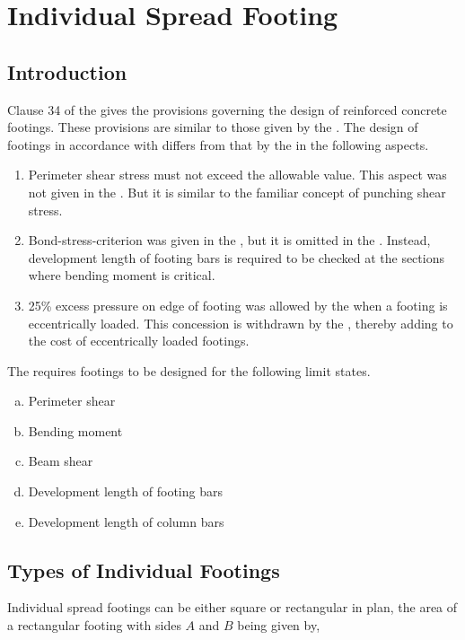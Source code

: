 \chapter{Individual Spread Footing}
\section{Introduction} Clause 34 of the   gives the
provisions governing the design of reinforced concrete footings.  These
provisions are similar to those given by the \citeauthor{aci1981aci}. 
The design of footings in accordance with  differs
from that by the  in the following aspects.

\begin{enumerate}[I]
\item Perimeter shear stress must not exceed the allowable value. This
aspect was not given in the . But it is similar to
the familiar concept of punching shear stress.

\item Bond-stress-criterion was given in the , but it
is omitted in the . Instead, development length of
footing bars is required to be checked at the sections where bending
moment is critical.

\item 25\% excess pressure on edge of footing was allowed by the 
 when a footing is eccentrically loaded. This 
concession is withdrawn by the , thereby adding to 
the cost of eccentrically loaded footings.
\end{enumerate}
The  requires footings to be designed for 
the following limit states.

\begin{enumerate}[(a)]
\item Perimeter shear
\item Bending moment
\item Beam shear
\item Development length of footing bars
\item Development length of column bars
\end{enumerate}

\section{Types of Individual Footings} Individual spread footings can 
be either square or rectangular in plan, the area of a rectangular
footing with sides $A$ and $B$ being given by,

